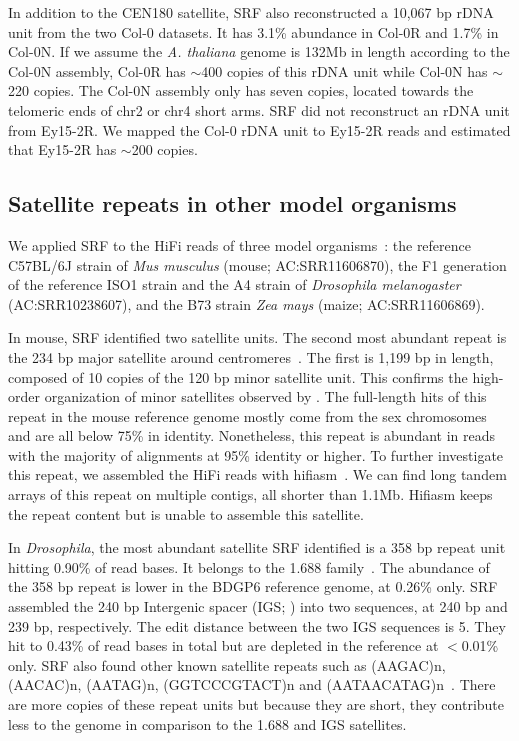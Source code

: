 \documentclass{bioinfo}
\begin{document}
In addition to the CEN180 satellite, SRF also reconstructed a 10,067 bp rDNA
unit from the two Col-0 datasets. It has 3.1\% abundance in Col-0R and 1.7\% in
Col-0N. If we assume the \emph{A. thaliana} genome is 132Mb in length
according to the Col-0N assembly, Col-0R has $\sim$400 copies of this rDNA unit
while Col-0N has $\sim$220 copies. The Col-0N assembly only has seven copies,
located towards the telomeric ends of chr2 or chr4 short arms.  SRF did not
reconstruct an rDNA unit from Ey15-2R. We mapped the Col-0 rDNA unit to Ey15-2R
reads and estimated that Ey15-2R has $\sim$200 copies.

\subsection{Satellite repeats in other model organisms}

We applied SRF to the HiFi reads of three model organisms~\citep{Hon:2020aa}: the
reference C57BL/6J strain of \emph{Mus musculus} (mouse; AC:SRR11606870), the
F1 generation of the reference ISO1 strain and the A4 strain of
\emph{Drosophila melanogaster} (AC:SRR10238607), and the B73 strain \emph{Zea
mays} (maize; AC:SRR11606869).

In mouse, SRF identified two satellite units. The second most abundant repeat
is the 234 bp major satellite around
centromeres~\citep{Arora:2021aa,Thakur:2021aa}. The first is 1,199 bp in length,
composed of 10 copies of the 120 bp minor satellite unit. This confirms the
high-order organization of minor satellites observed by \citet{Pertile:2009aa}.
The full-length hits of this repeat in the mouse reference genome mostly come
from the sex chromosomes and are all below 75\% in identity.  Nonetheless, this
repeat is abundant in reads with the majority of alignments at 95\% identity or
higher. To further investigate this repeat, we assembled the HiFi reads with
hifiasm~\citep{Cheng:2021aa}. We can find long tandem arrays of this repeat on
multiple contigs, all shorter than 1.1Mb.  Hifiasm keeps the repeat content but
is unable to assemble this satellite.

In \emph{Drosophila}, the most abundant satellite SRF identified is a 358 bp
repeat unit hitting 0.90\% of read bases. It belongs to the 1.688
family~\citep{Khost:2017aa}. The abundance of the 358 bp repeat is lower in the
BDGP6 reference genome, at 0.26\% only. SRF assembled the 240 bp Intergenic
spacer (IGS; \citealt{Shatskikh:2020aa}) into two sequences, at 240 bp and
239 bp, respectively. The edit distance between the two IGS sequences is 5. They
hit to 0.43\% of read bases in total but are depleted in the reference at
$<$0.01\% only. SRF also found other known satellite repeats such as (AAGAC)n,
(AACAC)n, (AATAG)n, (GGTCCCGTACT)n and
(AATAACATAG)n~\citep{Shatskikh:2020aa,Thakur:2021aa}.  There are more copies of
these repeat units but because they are short, they contribute less to the
genome in comparison to the 1.688 and IGS satellites.
\end{document}
